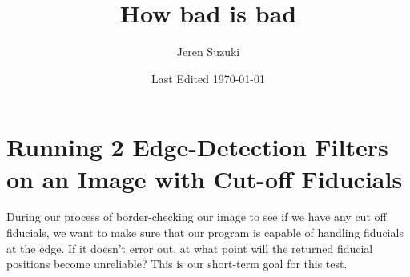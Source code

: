\documentclass[10pt]{article}
\title{How bad is bad}
\author{Jeren Suzuki}
\date{Last Edited \today}
\begin{document}
\maketitle
{}
\tableofcontents
\newpage
{}

\section{Running 2 Edge-Detection Filters on an Image with Cut-off Fiducials} %
\label{sec:running_2_edge_detection_filters_on_an_image_with_cut_off_fiducials}

During our process of border-checking our image to see if we have any cut off fiducials, we want to make sure that our program is capable of handling fiducials at the edge. If it doesn't error out, at what point will the returned fiducial positions become unreliable? This is our short-term goal for this test. 
\end{document}
